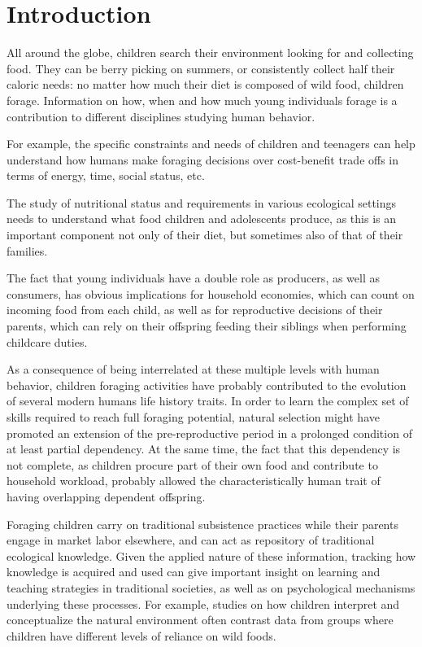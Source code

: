\section{Introduction}
All around the globe, children search their environment looking for and collecting food. 
They can be berry picking on summers, or consistently collect half their caloric needs: no matter how much their diet is composed of wild food, children forage. 
Information on how, when and how much young individuals forage is a contribution to different disciplines studying human behavior.

For example, the specific constraints and needs of children and teenagers can help understand how humans make foraging decisions over cost-benefit trade offs in terms of energy, time, social status, etc. 

The study of nutritional status and requirements in various ecological settings needs to understand what food children and adolescents produce, as this is an important component not only of their diet,
but sometimes also of that of their families. 

The fact that young individuals have a double role as producers, as well as consumers, has obvious implications for household economies, which can count on incoming food from each child, as well as for reproductive decisions of their parents, which can rely on their offspring feeding their siblings when performing childcare duties. 

As a consequence of being interrelated at these multiple levels with human behavior, children foraging activities have probably contributed to the evolution of several modern humans life history traits. In order to learn the complex set of skills required to reach full foraging potential, natural selection might have promoted an extension of the pre-reproductive period in a prolonged condition of at least partial dependency.
At the same time, the fact that this dependency is not complete, as children procure part of their own food and contribute to household workload, probably allowed the characteristically human trait of having overlapping dependent offspring.

Foraging children carry on traditional subsistence practices while their parents engage in market labor elsewhere, 
and can act as repository of traditional ecological knowledge.
Given the applied nature of these information, tracking how knowledge is acquired and used can give important insight on learning and teaching strategies in traditional societies, as well as on psychological mechanisms underlying these processes.
For example, studies on how children interpret and conceptualize the natural environment often contrast data from groups where children have different levels of reliance on wild foods.

